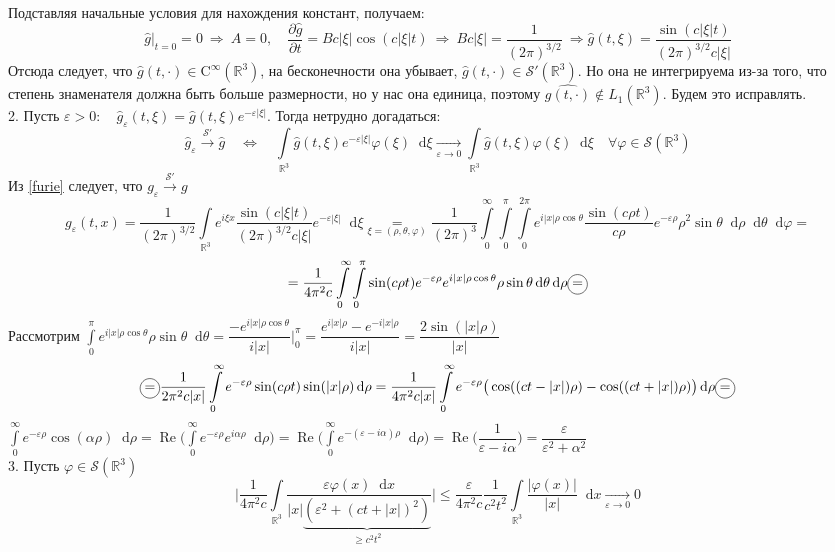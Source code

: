 \documentclass[11pt,a4paper]{report}
\numberwithin{equation}{section}
\numberwithin{figure}{chapter}
\numberwithin{table}{chapter}
\newcommand{\R}{\mathbb{R}}
\newcommand{\circled}[1]{\tikz[baseline=(char.base)] \node[draw,circle,inner sep=1pt,minimum size=1.4em] (char) {#1};}
\newcommand{\Cinf}{\text{C}^{\infty}}
\newcommand{\p}{\partial}
\newcommand{\dd}{\mathop{}\!\mathrm{d}}
\renewcommand{\phi}{\varphi}
\renewcommand{\epsilon}{\varepsilon}
\begin{document}
Подставляя начальные условия для нахождения констант, получаем:
\[
\hat{g}\Big|_{t=0} = 0 \ \Rightarrow \ A = 0, \quad \dfrac{\p \hat{g}}{\p t} = Bc|\xi|\cos(c|\xi|t) \ \Rightarrow \ Bc|\xi| = \dfrac{1}{(2\pi)^{3/2}} \ \Rightarrow \hat{g}(t,\xi)=\dfrac{\sin(c|\xi|t)}{(2\pi)^{3/2}c|\xi|}
\]
Отсюда следует, что \(\hat{g}(t, \cdot)\in\Cinf(\R^3)\), на бесконечности она убывает, \(\hat{g}(t, \cdot)\in\mathcal{S}'(\R^3)\). Но она не интегрируема из-за того, что степень знаменателя должна быть больше размерности, но у нас она единица, поэтому \(\hat{g(t,\cdot)}\notin L_1(\R^3)\). Будем это исправлять. \\
2. Пусть \(\epsilon>0: \quad \hat{g}_\epsilon(t,\xi)=\hat{g}(t,\xi)e^{-\epsilon|\xi|}\). Тогда нетрудно догадаться: 
\[\hat{g}_\epsilon\xrightarrow{\mathcal{S}'}\hat{g} \quad \Leftrightarrow \quad \int\limits_{\R^3}\hat{g}(t,\xi)e^{-\epsilon|\xi|}\phi(\xi)\dd \xi\xrightarrow[\epsilon\to 0]{}\int\limits_{\R^3} \hat{g}(t, \xi)\phi(\xi)\dd \xi \quad \forall \phi\in\mathcal{S}(\R^3)\]
Из \ref{furie} следует, что \(g_\epsilon\xrightarrow{\mathcal{S}'}g\)
\[g_\epsilon(t,x)=\dfrac{1}{(2\pi)^{3/2}}\int\limits_{\R^3}e^{i\xi x}\dfrac{\sin(c|\xi|t)}{(2\pi)^{3/2}c|\xi|}e^{-\epsilon|\xi|}\dd \xi\underset{\xi=(\rho,\theta,\phi)}{=}\dfrac{1}{(2\pi)^3}\int\limits_{0}^{\infty}\int\limits_{0}^{\pi}\int\limits_{0}^{2\pi}e^{i|x|\rho\cos\theta}\dfrac{\sin(c\rho t)}{c\rho}e^{-\epsilon\rho}\rho^2\sin\theta\dd \rho\dd \theta \dd \phi=\]
\[=\dfrac{1}{4\pi^2 c}\int\limits_{0}^{\infty}\int\limits_{0}^{\pi}\sin(c\rho t)e^{-\epsilon\rho}e^{i|x|\rho\cos\theta}\rho\sin\theta\dd \theta \dd \rho\circled{=}\]
Рассмотрим \(\int\limits_{0}^{\pi}e^{i|x|\rho\cos\theta}\rho\sin\theta\dd \theta=\dfrac{-e^{i|x|\rho\cos\theta}}{i|x|}\bigg|_{0}^{\pi}=\dfrac{e^{i|x|\rho}-e^{-i|x|\rho}}{i|x|}=\dfrac{2\sin(|x|\rho)}{|x|}\)
\[\circled{=}\dfrac{1}{2\pi^2c|x|}\int\limits_{0}^{\infty}e^{-\epsilon\rho}\sin(c\rho t)\sin(|x|\rho)\dd \rho=\dfrac{1}{4\pi^2 c|x|}\int\limits_{0}^{\infty}e^{-\epsilon\rho}\big(\cos((ct-|x|)\rho)-\cos((ct+|x|)\rho)\big)\dd \rho\circled{=}\]
\(\int\limits_{0}^{\infty}e^{-\epsilon\rho}\cos(\alpha\rho)\dd \rho=\operatorname{Re}\bigg(\int\limits_{0}^{\infty}e^{-\epsilon\rho}e^{i\alpha\rho}\dd \rho\bigg)=\operatorname{Re}\bigg(\int\limits_{0}^{\infty}e^{-(\epsilon-i\alpha)\rho}\dd \rho\bigg)=\operatorname{Re}\bigg(\dfrac{1}{\epsilon-i\alpha}\bigg)=\dfrac{\epsilon}{\epsilon^2+\alpha^2}\)\\
3. Пусть \(\phi\in\mathcal{S}(\R^3)\)
\[\bigg|\dfrac{1}{4\pi^2c}\int\limits_{\R^3}\dfrac{\epsilon\phi(x)\dd x}{|x|\underbrace{(\epsilon^2+(ct+|x|)^2)}_{\geq c^2t^2}}\bigg|\leq\dfrac{\epsilon}{4\pi^2c}\dfrac{1}{c^2t^2}\int\limits_{\R^3}\dfrac{|\phi(x)|}{|x|}\dd x\xrightarrow[\epsilon\to0]{}0\]
\end{document}
